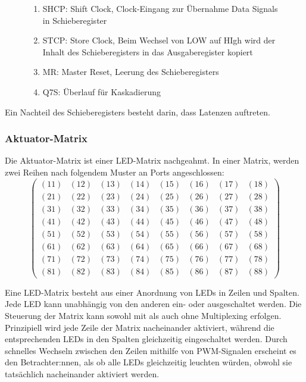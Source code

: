 \begin{figure}[htbp]
\begin{minipage}{0.55\textwidth}
\begin{enumerate}
		\item SHCP: Shift Clock, Clock-Eingang zur Übernahme Data Signals in Schieberegister
		\item STCP: Store Clock, Beim Wechsel von LOW auf HIgh wird der Inhalt des Schieberegisters in das Ausgaberegister kopiert %
		\item MR: Master Reset, Leerung des Schieberegisters
		\item Q7S: Überlauf für Kaskadierung
	\end{enumerate}
\end{minipage}
\end{figure}
Ein Nachteil des Schieberegisters besteht darin, dass Latenzen auftreten.
\subsubsection{Aktuator-Matrix\cite*[siehe ][]{LEDMatrix}}
Die Aktuator-Matrix ist einer LED-Matrix nachgeahmt.
In einer Matrix, werden zwei Reihen nach folgendem Muster an Ports angeschlossen:
$$
\begin{pmatrix}
	(11) & (12) & (13) & (14) & (15) & (16) & (17) & (18) \\
	(21) & (22) & (23) & (24) & (25) & (26) & (27) & (28) \\
	(31) & (32) & (33) & (34) & (35) & (36) & (37) & (38) \\
	(41) & (42) & (43) & (44) & (45) & (46) & (47) & (48) \\
	(51) & (52) & (53) & (54) & (55) & (56) & (57) & (58) \\
	(61) & (62) & (63) & (64) & (65) & (66) & (67) & (68) \\
	(71) & (72) & (73) & (74) & (75) & (76) & (77) & (78) \\
	(81) & (82) & (83) & (84) & (85) & (86) & (87) & (88)
\end{pmatrix}
$$

Eine LED-Matrix besteht aus einer Anordnung von LEDs in Zeilen und Spalten.
Jede LED kann unabhängig von den anderen ein- oder ausgeschaltet werden.
Die Steuerung der Matrix kann sowohl mit als auch ohne Multiplexing erfolgen.
Prinzipiell wird jede Zeile der Matrix nacheinander aktiviert, während die
entsprechenden LEDs in den Spalten gleichzeitig eingeschaltet werden.
Durch schnelles Wechseln zwischen den Zeilen mithilfe von \ac{PWM}-Signalen erscheint es den Betrachter:nnen, als ob alle LEDs
gleichzeitig leuchten würden, obwohl sie tatsächlich nacheinander aktiviert werden.

